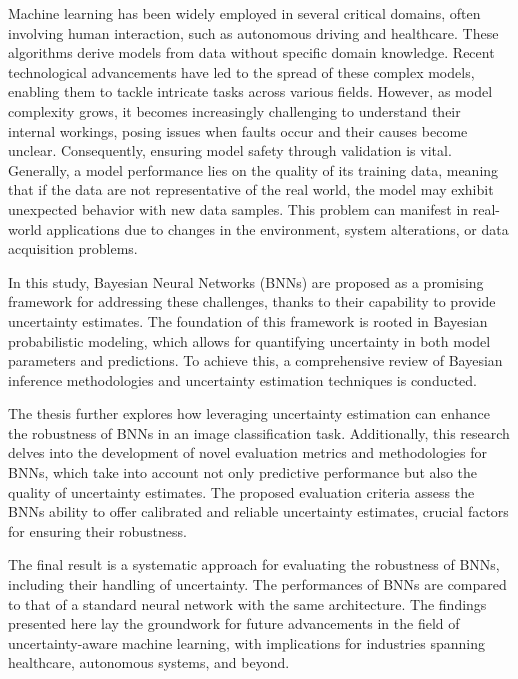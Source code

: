 Machine learning has been widely employed in several critical domains, often involving human interaction, such as autonomous driving and healthcare. These algorithms derive models from data without specific domain knowledge. Recent technological advancements have led to the spread of these complex models, enabling them to tackle intricate tasks across various fields. However, as model complexity grows, it becomes increasingly challenging to understand their internal workings, posing issues when faults occur and their causes become unclear. Consequently, ensuring model safety through validation is vital.
Generally, a model performance lies on the quality of its training data, meaning that if the data are not representative of the real world, the model may exhibit unexpected behavior with new data samples. This problem can manifest in real-world applications due to changes in the environment, system alterations, or data acquisition problems.

In this study, Bayesian Neural Networks (BNNs) are proposed as a promising framework for addressing these challenges, thanks to their capability to provide uncertainty estimates. The foundation of this framework is rooted in Bayesian probabilistic modeling, which allows for quantifying uncertainty in both model parameters and predictions. To achieve this, a comprehensive review of Bayesian inference methodologies and uncertainty estimation techniques is conducted.

The thesis further explores how leveraging uncertainty estimation can enhance the robustness of BNNs in an image classification task. Additionally, this research delves into the development of novel evaluation metrics and methodologies for BNNs, which take into account not only predictive performance but also the quality of uncertainty estimates. The proposed evaluation criteria assess the BNNs ability to offer calibrated and reliable uncertainty estimates, crucial factors for ensuring their robustness.

The final result is a systematic approach for evaluating the robustness of BNNs, including their handling of uncertainty. The performances of BNNs are compared to that of a standard neural network with the same architecture. The findings presented here lay the groundwork for future advancements in the field of uncertainty-aware machine learning, with implications for industries spanning healthcare, autonomous systems, and beyond.